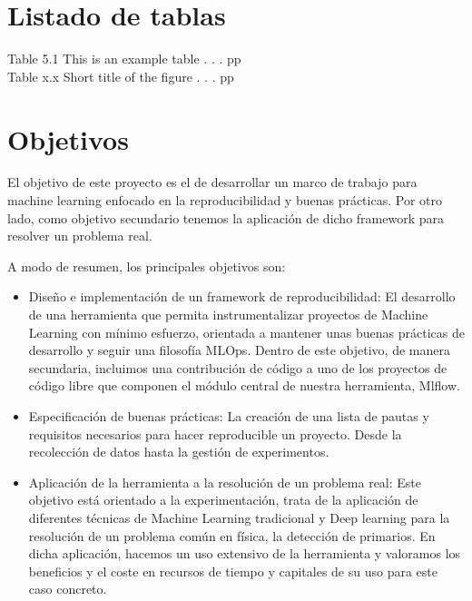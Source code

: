 \documentclass[
  12pt,
  a4paperpaper,
]{report}
\begin{document}
\hypertarget{listado-de-tablas}{%
\chapter*{Listado de tablas}\label{listado-de-tablas}}

Table 5.1 This is an example table . . . \hfill{pp}\\
Table x.x Short title of the figure . . . \hfill{pp}

\hypertarget{objetivos}{%
\chapter{Objetivos}\label{objetivos}}

El objetivo de este proyecto es el de desarrollar un marco de trabajo
para machine learning enfocado en la reproducibilidad y buenas
prácticas. Por otro lado, como objetivo secundario tenemos la aplicación
de dicho framework para resolver un problema real.

A modo de resumen, los principales objetivos son:

\begin{itemize}
\item
  Diseño e implementación de un framework de reproducibilidad: El
  desarrollo de una herramienta que permita instrumentalizar proyectos
  de Machine Learning con mínimo esfuerzo, orientada a mantener unas
  buenas prácticas de desarrollo y seguir una filosofía MLOps. Dentro de
  este objetivo, de manera secundaria, incluimos una contribución de
  código a uno de los proyectos de código libre que componen el módulo
  central de nuestra herramienta, Mlflow.
\item
  Especificación de buenas prácticas: La creación de una lista de pautas
  y requisitos necesarios para hacer reproducible un proyecto. Desde la
  recolección de datos hasta la gestión de experimentos.
\item
  Aplicación de la herramienta a la resolución de un problema real: Este
  objetivo está orientado a la experimentación, trata de la aplicación
  de diferentes técnicas de Machine Learning tradicional y Deep learning
  para la resolución de un problema común en física, la detección de
  primarios. En dicha aplicación, hacemos un uso extensivo de la
  herramienta y valoramos los beneficios y el coste en recursos de
  tiempo y capitales de su uso para este caso concreto.
\end{itemize}
\end{document}
